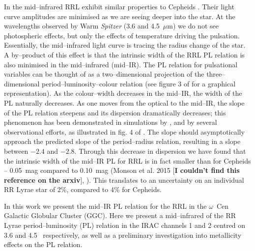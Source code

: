 In the mid--infrared RRL exhibit similar properties to Cepheids \citep{2013ApJ...776..135M}. Their light curve amplitudes are minimised as we are seeing deeper into the star. At the wavelengths observed by Warm \textit{Spitzer} (3.6 and 4.5~$\mu$m) we do not see photospheric effects, but only the effects of temperature driving the pulsation. Essentially, the mid--infrared light curve is tracing the radius change of the star. A by--product of this effect is that the intrinsic width of the RRL PL relation is also minimised in the mid--infrared (mid--IR). The PL relation for pulsational variables can be thought of as a two--dimensional projection of the three--dimensional period--luminosity--colour relation (see figure 3 of \citet{1991PASP..103..933M} for a graphical representation). As the colour--width decreases in the mid--IR, the width of the PL naturally decreases. As one moves from the optical to the mid--IR, the slope of the PL relation steepens and its dispersion dramatically decreases; this phenomenon has been demonstrated in simulations by \citet{2004ApJS..154..633C}, and by several observational efforts, as illustrated in fig. 4 of \citet{2013ApJ...776..135M}. The slope should asymptotically approach the predicted slope of the period--radius relation, resulting in a slope between $-2.4$ and $-2.8$. Through this decrease in dispersion we have found that the intrinsic width of the mid--IR PL for RRL is in fact smaller than for Cepheids -- 0.05~mag compared to 0.10~mag (Monson et al. 2015 [{\bf I couldn't find this reference on the arxiv}], \citep{2015arXiv150507858N}). This translates to an uncertainty on an individual RR Lyrae star of 2\%, compared to 4\% for Cepheids. 



In this work we present the mid--IR PL relation for the RRL in the $\omega$~Cen Galactic Globular Cluster (GGC). 
Here we present a mid--infrared of the RR Lyrae period--luminosity (PL) relation in the IRAC channels 1 and 2 centred on 3.6 and 4.5 \micron\ respectively, as well as a preliminary investigation into metallicity effects on the PL relation.



